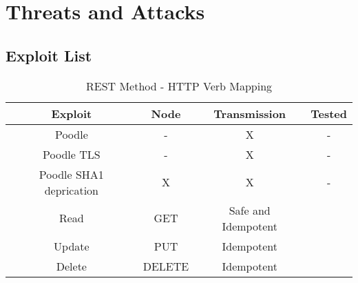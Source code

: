 \chapter{Threats and Attacks}
\section{Exploit List}

\begin{table}[ ]
\centering
\begin{tabular}{c|c|c|c}
 \bf Exploit & \bf Node & \bf Transmission & \bf Tested\\
 \hline
      Poodle                  &  - &  X & -                \\
      Poodle TLS              &  - &  X & -            \\
      Poodle SHA1 deprication &  X &  X & -\\
      Read & GET& Safe and Idempotent\\
      Update&  PUT& Idempotent\\
      Delete&  DELETE&  Idempotent\\
 \hline
\end{tabular}
\caption{REST Method - HTTP Verb Mapping}
\label{tab:restMapping}
\end{table}
